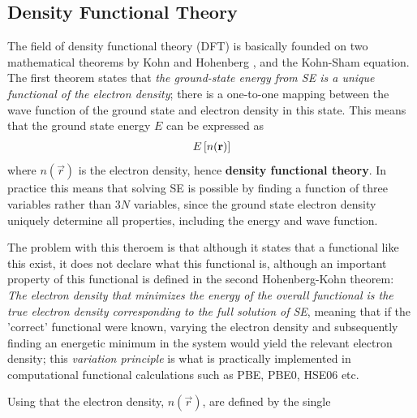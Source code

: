 {%
\subsection{Density Functional Theory}

The field of density functional theory (DFT) is basically founded on two mathematical theorems by Kohn and Hohenberg \citep{Hohenberg1964}, and the Kohn-Sham equation\citep{Kohn1965}. The first theorem states that \textit{the ground-state energy from SE is a unique functional of the electron density}; there is a one-to-one mapping between the wave function of the ground state and electron density in this state. This means that the ground state energy $E$ can be expressed as
\begin{align}
E\left[ n(\textbf{r}) \right]
\end{align}
where $n(\vec{r})$ is the electron density, hence \textbf{density functional theory}. In practice this means that solving SE is possible by finding a function of three variables rather than $3N$ variables, since the ground state electron density uniquely determine all properties, including the energy and wave function. 

The problem with this theroem is that although it states that a functional like this exist, it does not declare what this functional is, although an important property of this functional is defined in the second Hohenberg-Kohn theorem: \textit{The electron density that minimizes the energy of the overall functional is the true electron density corresponding to the full solution of SE}, meaning that if the 'correct' functional were known, varying the electron density and subsequently finding an energetic minimum in the system would yield the relevant electron density; this \textit{variation principle} is what is practically implemented in computational functional calculations such as PBE, PBE0, HSE06 etc.

Using that the electron density, $n(\vec{r})$, are defined by the single 
}

